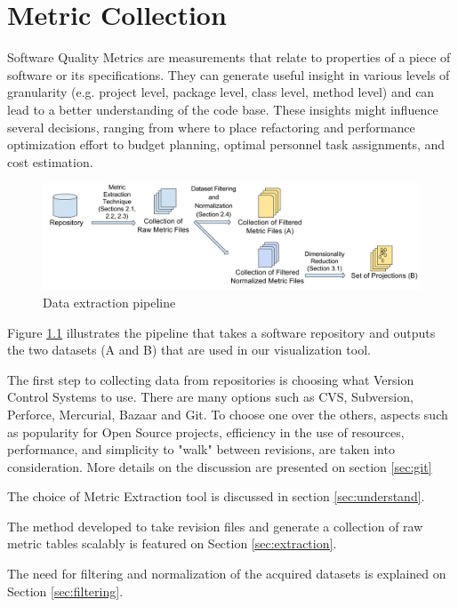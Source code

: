 \chapter{Metric Collection} \label{sec:metrics}

Software Quality Metrics are measurements that relate to properties of a piece of software or its specifications. They can generate useful insight in various levels of granularity (e.g. project level, package level, class level, method level) and can lead to a better understanding of the code base. These insights might influence several decisions, ranging from where to place refactoring and performance optimization effort to budget planning, optimal personnel task assignments, and cost estimation.

\begin{figure}[H]
	\centering
	\includegraphics[width=\textwidth]{figures/pipeline.png}
	\caption{Data extraction pipeline}
	\label{fig:data_pipeline}
\end{figure}

Figure \ref{fig:data_pipeline} illustrates the pipeline that takes a software repository and outputs the two datasets (A and B) that are used in our visualization tool.

The first step to collecting data from repositories is choosing what Version Control Systems to use. There are many options such as CVS, Subversion, Perforce, Mercurial, Bazaar and Git. To choose one over the others, aspects such as popularity for Open Source projects, efficiency in the use of resources, performance, and simplicity to "walk" between revisions, are taken into consideration. More details on the discussion are presented on section \ref{sec:git}

The choice of Metric Extraction tool is discussed in section \ref{sec:understand}.

The method developed to take revision files and generate a collection of raw metric tables scalably is featured on Section \ref{sec:extraction}.

The need for filtering and normalization of the acquired datasets is explained on Section \ref{sec:filtering}.

